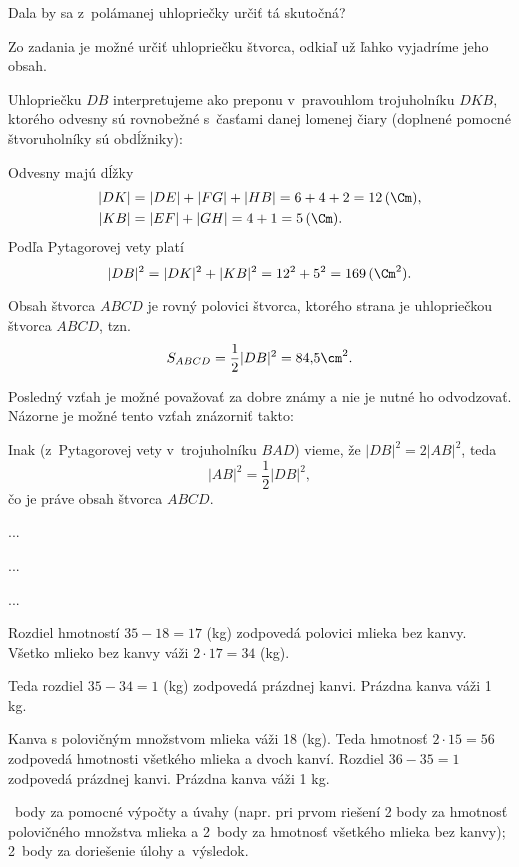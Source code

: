 {%
\napad
Dala by sa z~polámanej uhlopriečky určiť tá skutočná?

\riesenie
Zo zadania je možné určiť uhlopriečku štvorca, odkiaľ už ľahko vyjadríme jeho obsah.

Uhlopriečku $DB$ interpretujeme ako preponu v~pravouhlom trojuholníku $DKB$, ktorého odvesny sú rovnobežné s~časťami danej lomenej čiary (doplnené pomocné štvoruholníky sú obdĺžniky):
%

Odvesny majú dĺžky
$$\aligned
\vert{}DK\vert{} &=\vert{}DE\vert{}+\vert{}FG\vert{}+\vert{}HB\vert{} =6+4+2 =12\, (\Cm), \\
\vert{}KB\vert{} &=\vert{}EF\vert{}+\vert{}GH\vert{} =4+1 =5\,(\Cm).
\endaligned
$$
Podľa Pytagorovej vety platí
$$
|DB|^2 =|DK|^2+|KB|^2 =12^2+5^2 =169\,(\Cm^2).
$$

Obsah štvorca $ABCD$ je rovný polovici štvorca, ktorého strana je uhlopriečkou štvorca $ABCD$, tzn.
$$
S_{ABCD} =\frac12|DB|^2 =84{,}5\cm^2.
$$

\poznamka
Posledný vzťah je možné považovať za dobre známy a nie je nutné ho odvodzovať.
Názorne je možné tento vzťah znázorniť takto:
%

Inak (z~Pytagorovej vety v~trojuholníku $BAD$) vieme, že $|DB|^2=2|AB|^2$, teda
$$
|AB|^2=\frac12|DB|^2 ,
$$
čo je práve obsah štvorca $ABCD$.}

{%
...}

{%
...}

{%
...}

{%
Rozdiel hmotností $35-18=17$ (kg) zodpovedá polovici mlieka bez kanvy.
Všetko mlieko bez kanvy váži $2\cdot17=34$ (kg).

Teda rozdiel $35-34=1$ (kg) zodpovedá prázdnej kanvi.
Prázdna kanva váži 1 kg.

\ineriesenie
Kanva s polovičným množstvom mlieka váži 18 (kg). Teda hmotnosť $2\cdot15=56$ zodpovedá hmotnosti všetkého mlieka a dvoch kanví.
Rozdiel $36-35=1$ zodpovedá prázdnej kanvi. Prázdna kanva váži 1 kg.

~body za pomocné výpočty a úvahy (napr. pri prvom riešení 2 body za hmotnosť polovičného množstva mlieka a 2~body za hmotnosť všetkého mlieka bez kanvy);
2~body za doriešenie úlohy a~výsledok.
\endhodnotenie
}

